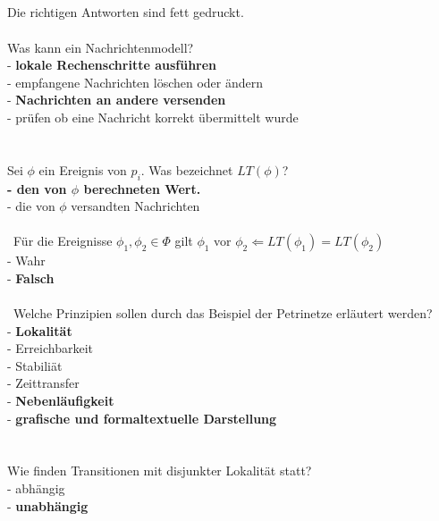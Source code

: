 \documentclass[a4paper,12pt]{scrartcl}
\begin{document}
\subsection{}
\subsection{}
\subsubsection{}
Die richtigen Antworten sind fett gedruckt.\\\\
Was kann ein Nachrichtenmodell?\\
- \textbf{lokale Rechenschritte ausführen}\\
- empfangene Nachrichten löschen oder ändern\\
- \textbf{Nachrichten an andere versenden}\\
- prüfen ob eine Nachricht korrekt übermittelt wurde\\\\\\
Sei $\phi$ ein Ereignis von $p_i$. Was bezeichnet $LT(\phi)$?\\
\textbf{- den von $\phi$ berechneten Wert.\\}
- die von $\phi$ versandten Nachrichten\\
\\\
Für die Ereignisse $\phi_1 ,\phi_2\in\Phi$ gilt $\phi_1$ vor $\phi_2\Leftarrow LT(\phi_1)=LT(\phi_2)$\\
- Wahr\\
- \textbf{Falsch}\\\\\
Welche Prinzipien sollen durch das Beispiel der Petrinetze erläutert werden?\\
- \textbf{Lokalität}\\
- Erreichbarkeit\\
- Stabiliät\\
- Zeittransfer\\
- \textbf{Nebenläufigkeit}\\
- \textbf{grafische und formaltextuelle Darstellung}\\\\\\
Wie finden Transitionen mit disjunkter Lokalität statt?\\
- abhängig\\
- \textbf{unabhängig}\\
\end{document}
